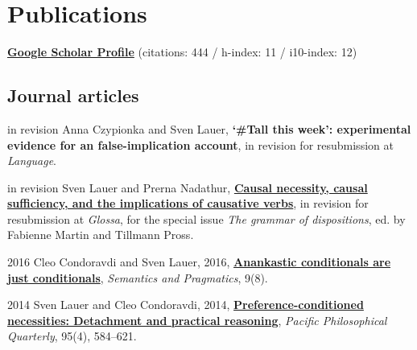 \section*{Publications}
%
\href{https://scholar.google.de/citations?user=D6WVFSYAAAAJ}{\textbf{Google Scholar Profile}} (citations: 444 / h-index: 11 / i10-index: 12)
\subsection*{Journal articles}
\begin{dated}
	\item[in revision]
		Anna Czypionka and Sven Lauer, 
		\textbf{`\#Tall this week': experimental evidence for an false-implication account}, 
		in revision for resubmission at \textit{Language}.
	\item[in revision]
		Sven Lauer and Prerna Nadathur, 
		\href{http://sven-lauer.net/output/LauerNadathur-CausalSufficiency.pdf}{\textbf{Causal necessity, causal sufficiency, and the implications of causative verbs}}, 
		in revision for resubmission at {\it Glossa}, for the special issue \textit{The grammar of dispositions}, ed. by Fabienne Martin and Tillmann Pross.
	\item[2016]
		Cleo Condoravdi and Sven Lauer, 2016,
		\href{http://dx.doi.org/10.3765/sp.9.8}{\textbf{Anankastic conditionals are just conditionals}},
		\textit{Semantics and Pragmatics}, 9(8).
	\item[2014]
		Sven Lauer and Cleo Condoravdi, 2014,
		\href{http://web.stanford.edu/~cleoc/Pac-Phil-Quart-preprint.pdf}{\textbf{Preference-conditioned necessities: Detachment and practical reasoning}},
		\textit{Pacific Philosophical Quarterly}, 95(4), 584--621.
\end{dated}
